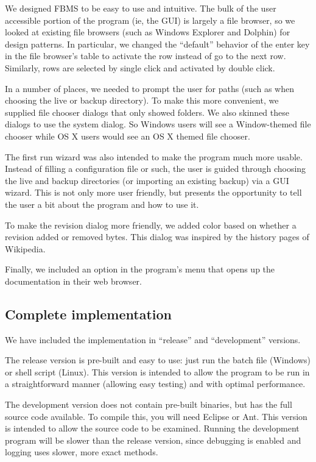 \documentclass[12pt,a4paper]{article}
\begin{document}
We designed FBMS to be easy to use and intuitive. The bulk of the user accessible portion of the program (ie, the GUI) is largely a file browser, so we looked at existing file browsers (such as Windows Explorer\cite{explorer} and Dolphin\cite{dolphin}) for design patterns. In particular, we changed the ``default'' behavior of the enter key in the file browser's table to activate the row instead of go to the next row. Similarly, rows are selected by single click and activated by double click.

In a number of places, we needed to prompt the user for paths (such as when choosing the live or backup directory). To make this more convenient, we supplied file chooser dialogs that only showed folders. We also skinned these dialogs to use the system dialog. So Windows users will see a Window-themed file chooser while OS X users would see an OS X themed file chooser.

The first run wizard was also intended to make the program much more usable. Instead of filling a configuration file or such, the user is guided through choosing the live and backup directories (or importing an existing backup) via a GUI wizard. This is not only more user friendly, but presents the opportunity to tell the user a bit about the program and how to use it.

To make the revision dialog more friendly, we added color based on whether a revision added or removed bytes. This dialog was inspired by the history pages of Wikipedia\cite{wikipedia}.

Finally, we included an option in the program's menu that opens up the documentation in their web browser.

\subsection{Complete implementation}
We have included the implementation in ``release'' and ``development'' versions.

The release version is pre-built and easy to use: just run the batch file (Windows) or shell script (Linux). This version is intended to allow the program to be run in a straightforward manner (allowing easy testing) and with optimal performance.

The development version does not contain pre-built binaries, but has the full source code available. To compile this, you will need Eclipse\cite{eclipse} or Ant\cite{ant}. This version is intended to allow the source code to be examined. Running the development program will be slower than the release version, since debugging is enabled and logging uses slower, more exact methods.
\end{document}

